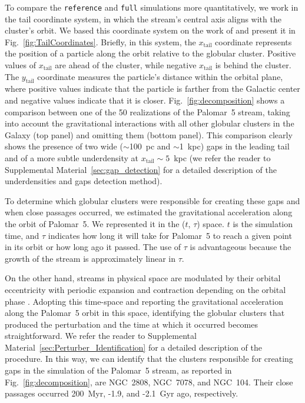         To compare the \texttt{reference} and \texttt{full} simulations more quantitatively, we work in the tail coordinate system, in which the stream's central axis aligns with the cluster's orbit. We based this coordinate system on the work of \citet{2004AJ....127.2753D} and present it in Fig.~\ref{fig:TailCoordinates}. Briefly, in this system, the $x_{\mathrm{tail}}$ coordinate represents the position of a particle along the orbit relative to the globular cluster. Positive values of $x_{\mathrm{tail}}$ are ahead of the cluster, while negative $x_{\mathrm{tail}}$ is behind the cluster. The $y_{\mathrm{tail}}$ coordinate measures the particle's distance within the orbital plane, where positive values indicate that the particle is farther from the Galactic center and negative values indicate that it is closer. Fig.~\ref{fig:decomposition} shows a comparison between one of the 50 realizations of the Palomar~5 stream, taking into account the gravitational interactions with all other globular clusters in the Galaxy (top panel) and omitting them (bottom panel). This comparison clearly shows the presence of two wide ($\sim$100~pc and $\sim$1~kpc) gaps in the leading tail and of a more subtle underdensity at $x_{\mathrm{tail}}\sim 5$~kpc (we refer the reader to Supplemental Material~\ref{sec:gap_detection} for a detailed description of the underdensities and gaps detection method). 
    
        To determine which globular clusters were responsible for creating these gaps and when close passages occurred, we estimated the gravitational acceleration along the orbit of Palomar~5. We represented it in the ($t$, $\tau$) space. $t$ is the simulation time, and $\tau$ indicates how long it will take for Palomar~5 to reach a given point in its orbit or how long ago it passed. The use of $\tau$ is advantageous because the growth of the stream is approximately linear in $\tau$. 
    
        On the other hand, streams in physical space are modulated by their orbital eccentricity with periodic expansion and contraction depending on the orbital phase \citep[see the top panel of Fig.~5.][for an example]{2016MNRAS.457.3817S}. Adopting this time-space and reporting the gravitational acceleration along the Palomar~5 orbit in this space, identifying the globular clusters that produced the perturbation and the time at which it occurred becomes straightforward. We refer the reader to Supplemental Material~\ref{sec:Perturber_Identification} for a detailed description of the procedure. In this way, we can identify that the clusters responsible for creating gaps in the simulation of the Palomar~5 stream, as reported in Fig.~\ref{fig:decomposition}, are NGC~2808, NGC~7078, and NGC~104. Their close passages occurred 200~Myr, -1.9, and -2.1~Gyr ago, respectively. 
    

